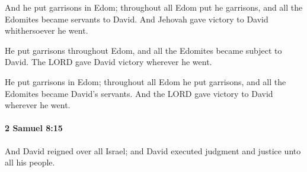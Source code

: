 			\begin{versebox}
					\item[BHS] 
					\item[ASV] And he put garrisons in Edom; throughout all Edom put he garrisons, and all the Edomites became servants to David. And Jehovah gave victory to David whithersoever he went.
					\item[NIV] He put garrisons throughout Edom, and all the Edomites became subject to David. The LORD gave David victory wherever he went.
					\item[NRSV] He put garrisons in Edom; throughout all Edom he put garrisons, and all the Edomites became David’s servants. And the LORD gave victory to David wherever he went.
			\end{versebox}

		\paragraph{2 Samuel 8:15} %
			\label{2SAMUEL-8-15}

			And David reigned over all Israel; and David executed judgment and justice unto all his people.

